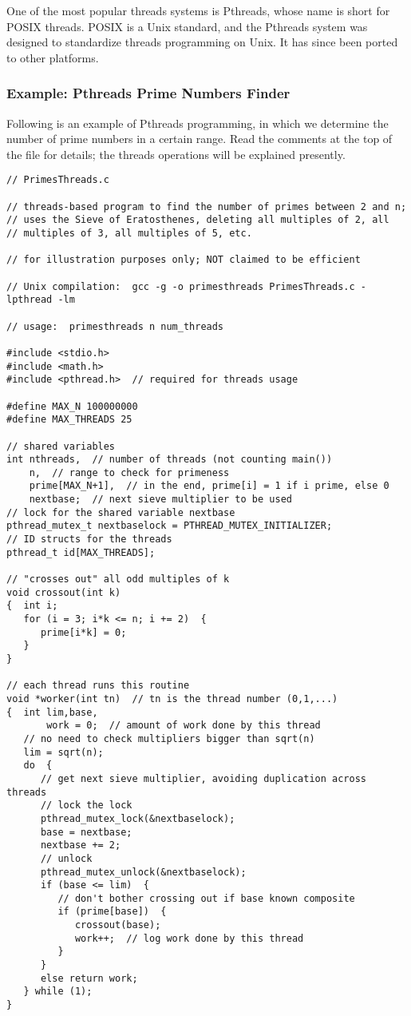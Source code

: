 One of the most popular threads systems is Pthreads, whose name is short
for POSIX threads.  POSIX is a Unix standard, and the Pthreads system
was designed to standardize threads programming on Unix.  It has since
been ported to other platforms.

\subsubsection{Example: Pthreads Prime Numbers Finder}
\label{pthreadsprime}

Following is an example of Pthreads programming, in which we determine
the number of prime numbers in a certain range.  Read the comments at
the top of the file for details; the threads operations will be
explained presently.

\begin{Verbatim}
// PrimesThreads.c

// threads-based program to find the number of primes between 2 and n;
// uses the Sieve of Eratosthenes, deleting all multiples of 2, all
// multiples of 3, all multiples of 5, etc.

// for illustration purposes only; NOT claimed to be efficient

// Unix compilation:  gcc -g -o primesthreads PrimesThreads.c -lpthread -lm

// usage:  primesthreads n num_threads

#include <stdio.h>
#include <math.h>
#include <pthread.h>  // required for threads usage

#define MAX_N 100000000
#define MAX_THREADS 25

// shared variables
int nthreads,  // number of threads (not counting main())
    n,  // range to check for primeness
    prime[MAX_N+1],  // in the end, prime[i] = 1 if i prime, else 0
    nextbase;  // next sieve multiplier to be used
// lock for the shared variable nextbase
pthread_mutex_t nextbaselock = PTHREAD_MUTEX_INITIALIZER;
// ID structs for the threads
pthread_t id[MAX_THREADS];

// "crosses out" all odd multiples of k
void crossout(int k)
{  int i;
   for (i = 3; i*k <= n; i += 2)  {
      prime[i*k] = 0;
   }
}

// each thread runs this routine
void *worker(int tn)  // tn is the thread number (0,1,...)
{  int lim,base,
       work = 0;  // amount of work done by this thread
   // no need to check multipliers bigger than sqrt(n)
   lim = sqrt(n);
   do  {
      // get next sieve multiplier, avoiding duplication across threads
      // lock the lock
      pthread_mutex_lock(&nextbaselock);
      base = nextbase;
      nextbase += 2;
      // unlock
      pthread_mutex_unlock(&nextbaselock);
      if (base <= lim)  {
         // don't bother crossing out if base known composite
         if (prime[base])  {
            crossout(base);
            work++;  // log work done by this thread
         }
      }
      else return work;
   } while (1);
}


\end{Verbatim}
